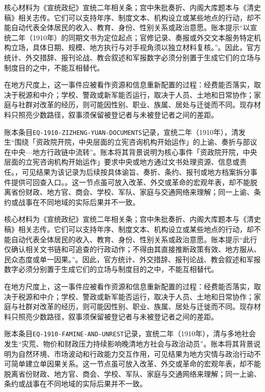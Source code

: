 核心材料为《宣统政纪》宣统二年相关条；宫中朱批奏折、内阁大库题本与《清史稿》相关志传。它们可以支持年序、制度文本、机构设立或某些地点的行动，却不能自动代表全体居民的收入、教育、身份、性别关系或政治意愿。账本提示“以宣统二年（1910年）的同期文书为定位起点；官修记录、奏报或外交文本服务特定机构立场，具体日期、规模、地方执行与对手视角须以独立材料复核。”。因此，官方统计、外交措辞、报刊论战、教会叙述和军报数字必须分别置于生成它们的立场与制度目的之中，不能互相替代。

在地方尺度上，这一事件应被看作资源和信息重新配置的过程：经费能否落实，取决于税源和中介；学校、警政或新军能否运行，取决于人员、土地和日常协作；家庭与社群对改革的经历，则可能因性别、职业、族属、居处与迁徙而不同。现存材料只照亮少数路径，叙事须保留被登记者与未被登记者之间的差距。

账本条目\texttt{EQ-1910-ZIZHENG-YUAN-DOCUMENTS}记录，宣统二年（1910年），清发生“围绕「资政院开院，中央层面的立宪咨询机构开始运作」的上谕、奏折与部议在中央—地方行政链中流转”。账本将其背景说明为核心事件「资政院开院，中央层面的立宪咨询机构开始运作」要求中央或地方通过文书处理资源、信息或责任。，可见结果为该记录为后续按具体谕旨、奏折、条约、报刊或地方档案拆分事件提供可回查入口。。这一节点虽可放入改革、外交或革命的宏观年表，却不能脱离省份财政、地方官、商会、学校、军队、家庭与交通网络来理解；同一上谕、条约或战事在不同地域的实际后果并不一致。

核心材料为《宣统政纪》宣统二年相关条；宫中朱批奏折、内阁大库题本与《清史稿》相关志传。它们可以支持年序、制度文本、机构设立或某些地点的行动，却不能自动代表全体居民的收入、教育、身份、性别关系或政治意愿。账本提示“此行仅确认相关文书链和可追查的行政动作；不得由其直接推断政策有效、地方服从、民众态度或单一因果。”。因此，官方统计、外交措辞、报刊论战、教会叙述和军报数字必须分别置于生成它们的立场与制度目的之中，不能互相替代。

在地方尺度上，这一事件应被看作资源和信息重新配置的过程：经费能否落实，取决于税源和中介；学校、警政或新军能否运行，取决于人员、土地和日常协作；家庭与社群对改革的经历，则可能因性别、职业、族属、居处与迁徙而不同。现存材料只照亮少数路径，叙事须保留被登记者与未被登记者之间的差距。

账本条目\texttt{EQ-1910-FAMINE-AND-UNREST}记录，宣统二年（1910年），清与多地社会发生“灾荒、物价和财政压力持续影响晚清地方社会与政治动员”。账本将其背景说明为自然环境、市场波动和行政能力交互作用，可见结果为地方灾情与政治行动不可简单建立单因果关系。这一节点虽可放入改革、外交或革命的宏观年表，却不能脱离省份财政、地方官、商会、学校、军队、家庭与交通网络来理解；同一上谕、条约或战事在不同地域的实际后果并不一致。

